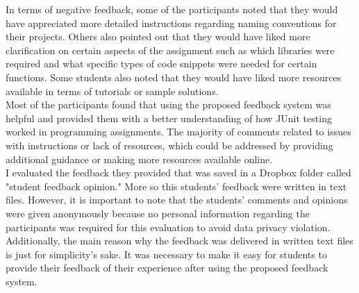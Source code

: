 In terms of negative feedback, some of the participants noted that they would have appreciated more detailed instructions regarding naming conventions for their projects. Others also pointed out that they would have liked more clarification on certain aspects of the assignment such as which libraries were required and what specific types of code snippets were needed for certain functions. Some students also noted that they would have liked more resources available in terms of tutorials or sample solutions. \\

Most of the participants found that using the proposed feedback system was helpful and provided them with a better understanding of how JUnit testing worked in programming assignments. The majority of comments related to issues with instructions or lack of resources, which could be addressed by providing additional guidance or making more resources available online. \\

I evaluated the feedback they provided that was saved in a Dropbox folder called "student feedback opinion." More so this students’ feedback were written in text files. However, it is important to note that the students’ comments and opinions were given anonymously because no personal information regarding the participants was required for this evaluation to avoid data privacy violation. Additionally, the main reason why the feedback was delivered in written text files is just for simplicity’s sake. It was necessary to make it easy for students to provide their feedback of their experience after using the proposed feedback system. \\

